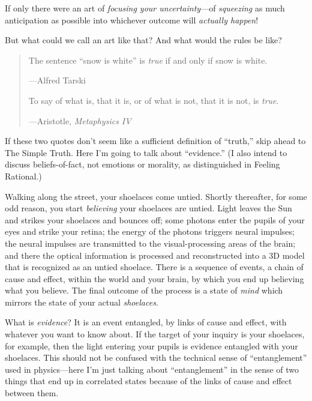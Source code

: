 {
 If only there were an art of \textit{focusing your
uncertainty}{}---of \textit{squeezing} as much anticipation as possible
into whichever outcome will \textit{actually happen}!}

{
 But what could we call an art like that? And what would the rules
be like?}

\myendsectiontext


\begin{quote}
{
 The sentence ``snow is white''
is \textit{true} if and only if snow is white.}

{\raggedleft
 {}---Alfred Tarski
\par}

{
 To say of what is, that it is, or of what is not, that it is not,
is \textit{true}.}

{\raggedleft
 {}---Aristotle, \textit{Metaphysics IV}
\par}
\end{quote}


{
 If these two quotes don't seem like a sufficient
definition of ``truth,'' skip ahead
to The Simple Truth. Here I'm going to talk about
``evidence.'' (I also intend to
discuss beliefs-of-fact, not emotions or morality, as distinguished in
Feeling Rational.)}

{
 Walking along the street, your shoelaces come untied. Shortly
thereafter, for some odd reason, you start \textit{believing} your
shoelaces are untied. Light leaves the Sun and strikes your shoelaces
and bounces off; some photons enter the pupils of your eyes and strike
your retina; the energy of the photons triggers neural impulses; the
neural impulses are transmitted to the visual-processing areas of the
brain; and there the optical information is processed and reconstructed
into a 3D model that is recognized as an untied shoelace. There is a
sequence of events, a chain of cause and effect, within the world and
your brain, by which you end up believing what you believe. The final
outcome of the process is a state of \textit{mind} which mirrors the
state of your actual \textit{shoelaces}.}

{
 What is \textit{evidence}? It is an event entangled, by links of
cause and effect, with whatever you want to know about. If the target
of your inquiry is your shoelaces, for example, then the light entering
your pupils is evidence entangled with your shoelaces. This should not
be confused with the technical sense of
``entanglement'' used in
physics---here I'm just talking about
``entanglement'' in the sense of two
things that end up in correlated states because of the links of cause
and effect between them.}


